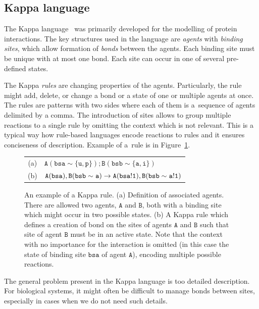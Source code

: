 \documentclass[11pt,a4paper]{report}
\begin{document}
\subsection{Kappa language}
\label{kappa}

The Kappa language~\cite{kappa_formal} was primarily developed for the modelling of protein interactions. The key structures used in the language are \emph{agents} with \emph{binding sites}, which allow formation of \emph{bonds} between the agents. Each binding site must be unique with at most one bond. Each site can occur in one of several pre-defined states.

The Kappa \emph{rules} are changing properties of the agents. Particularly, the rule might add, delete, or change a bond or a state of one or multiple agents at once. The rules are patterns with two sides where each of them is a~sequence of agents delimited by a comma. The introduction of sites allows to group multiple reactions to a single rule by omitting the context which is not relevant. This is a typical way how rule-based languages encode reactions to rules and it ensures conciseness of description. Example of a~rule is in Figure~\ref{kappa-rule}.

\begin{figure}[!h]
\begin{center}
\begin{tabular}{c l}
(a) & $\mathtt{A(bsa\sim\{ u, p \}) ; B(bsb\sim\{ a, i \})}$ \\
(b) & $\mathtt{A(bsa), B(bsb\sim\hspace*{0.01cm}a) \rightarrow A(bsa!1), B(bsb\sim\hspace*{0.01cm}a!1)}$ \\
\end{tabular}
\end{center}
\caption{An example of a Kappa rule. (a) Definition of associated agents. There are allowed two agents, $\mathtt{A}$ and $\mathtt{B}$, both with a binding site which might occur in two possible states. (b) A Kappa rule which defines a creation of bond on the sites of agents $\mathtt{A}$ and $\mathtt{B}$ such that site of agent $\mathtt{B}$ must be in an active state. Note that the context with no importance for the interaction is omitted (in this case the state of binding site $\mathtt{bsa}$ of agent $\mathtt{A}$), encoding multiple possible reactions.}\label{kappa-rule}
\end{figure}

The general problem present in the Kappa language is too detailed description. For biological systems, it might often be difficult to manage bonds between sites, especially in cases when we do not need such details.
\end{document}
